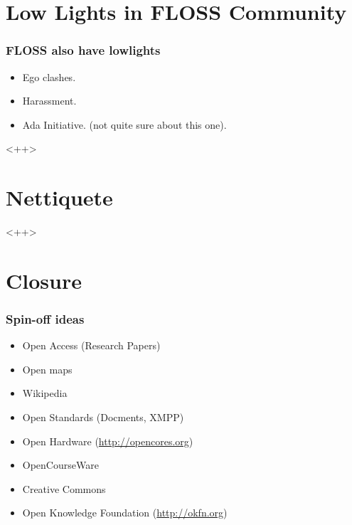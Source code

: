 \documentclass[hyperref={pdfpagelabels=false},xcolor=pst,pdf,fragile]{beamer}
\begin{document}
\section{Low Lights in FLOSS Community}

\begin{frame}
  \frametitle{FLOSS also have lowlights}

  \begin{itemize}
	\item Ego clashes.
	\item Harassment.
	\item Ada Initiative. (not quite sure about this one).
  \end{itemize}<++>

\end{frame}

\section{Nettiquete}<++>

\section{Closure}

\begin{frame}
  \frametitle{Spin-off ideas}

  \begin{itemize}
	  \item Open Access (Research Papers)

	  \item Open maps
		  \pause
	  \item Wikipedia
		  \pause
	  \item Open Standards (Docments, XMPP)
		  \pause
	  \item Open Hardware (\url{http://opencores.org})
		  \pause
	  \item OpenCourseWare
		  \pause
	  \item Creative Commons
		  \pause
	  \item Open Knowledge Foundation (\url{http://okfn.org})
  \end{itemize}

\end{frame}
\end{document}
